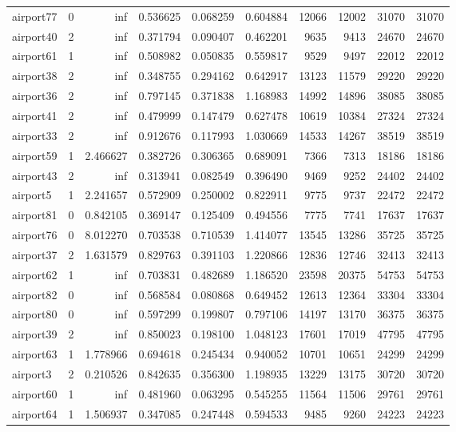 \begin{longtable}{|l|r|r|r|r|r|r|r|r|r|}
airport77 & 0 & inf & 0.536625 & 0.068259 & 0.604884 & 12066 & 12002 & 31070 & 31070 \\
airport40 & 2 & inf & 0.371794 & 0.090407 & 0.462201 & 9635 & 9413 & 24670 & 24670 \\
airport61 & 1 & inf & 0.508982 & 0.050835 & 0.559817 & 9529 & 9497 & 22012 & 22012 \\
airport38 & 2 & inf & 0.348755 & 0.294162 & 0.642917 & 13123 & 11579 & 29220 & 29220 \\
airport36 & 2 & inf & 0.797145 & 0.371838 & 1.168983 & 14992 & 14896 & 38085 & 38085 \\
airport41 & 2 & inf & 0.479999 & 0.147479 & 0.627478 & 10619 & 10384 & 27324 & 27324 \\
airport33 & 2 & inf & 0.912676 & 0.117993 & 1.030669 & 14533 & 14267 & 38519 & 38519 \\
airport59 & 1 & 2.466627 & 0.382726 & 0.306365 & 0.689091 & 7366 & 7313 & 18186 & 18186 \\
airport43 & 2 & inf & 0.313941 & 0.082549 & 0.396490 & 9469 & 9252 & 24402 & 24402 \\
airport5 & 1 & 2.241657 & 0.572909 & 0.250002 & 0.822911 & 9775 & 9737 & 22472 & 22472 \\
airport81 & 0 & 0.842105 & 0.369147 & 0.125409 & 0.494556 & 7775 & 7741 & 17637 & 17637 \\
airport76 & 0 & 8.012270 & 0.703538 & 0.710539 & 1.414077 & 13545 & 13286 & 35725 & 35725 \\
airport37 & 2 & 1.631579 & 0.829763 & 0.391103 & 1.220866 & 12836 & 12746 & 32413 & 32413 \\
airport62 & 1 & inf & 0.703831 & 0.482689 & 1.186520 & 23598 & 20375 & 54753 & 54753 \\
airport82 & 0 & inf & 0.568584 & 0.080868 & 0.649452 & 12613 & 12364 & 33304 & 33304 \\
airport80 & 0 & inf & 0.597299 & 0.199807 & 0.797106 & 14197 & 13170 & 36375 & 36375 \\
airport39 & 2 & inf & 0.850023 & 0.198100 & 1.048123 & 17601 & 17019 & 47795 & 47795 \\
airport63 & 1 & 1.778966 & 0.694618 & 0.245434 & 0.940052 & 10701 & 10651 & 24299 & 24299 \\
airport3 & 2 & 0.210526 & 0.842635 & 0.356300 & 1.198935 & 13229 & 13175 & 30720 & 30720 \\
airport60 & 1 & inf & 0.481960 & 0.063295 & 0.545255 & 11564 & 11506 & 29761 & 29761 \\
airport64 & 1 & 1.506937 & 0.347085 & 0.247448 & 0.594533 & 9485 & 9260 & 24223 & 24223 \\

\end{longtable}

